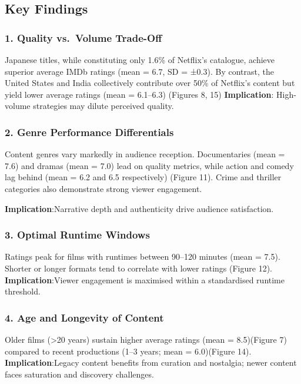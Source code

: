 \documentclass[
  man,floatsintext]{apa6}
\begin{document}
\subsection{Key Findings}\label{key-findings}

\subsubsection{1. Quality vs.~Volume Trade-Off}\label{quality-vs.-volume-trade-off}

Japanese titles, while constituting only 1.6\% of Netflix's catalogue, achieve superior average IMDb ratings (mean = 6.7, SD = ±0.3). By contrast, the United States and India collectively contribute over 50\% of Netflix's content but yield lower average ratings (mean = 6.1--6.3) (Figures 8, 15)
\textbf{Implication}: High-volume strategies may dilute perceived quality.

\subsubsection{2. Genre Performance Differentials}\label{genre-performance-differentials}

Content genres vary markedly in audience reception. Documentaries (mean = 7.6) and dramas (mean = 7.0) lead on quality metrics, while action and comedy lag behind (mean = 6.2 and 6.5 respectively) (Figure 11). Crime and thriller categories also demonstrate strong viewer engagement.

\textbf{Implication}:Narrative depth and authenticity drive audience satisfaction.

\subsubsection{3. Optimal Runtime Windows}\label{optimal-runtime-windows}

Ratings peak for films with runtimes between 90--120 minutes (mean = 7.5). Shorter or longer formats tend to correlate with lower ratings (Figure 12).
\textbf{Implication}:Viewer engagement is maximised within a standardised runtime threshold.

\subsubsection{4. Age and Longevity of Content}\label{age-and-longevity-of-content}

Older films (\textgreater20 years) sustain higher average ratings (mean = 8.5)(Figure 7) compared to recent productions (1--3 years; mean = 6.0)(Figure 14).
\textbf{Implication}:Legacy content benefits from curation and nostalgia; newer content faces saturation and discovery challenges.
\end{document}
